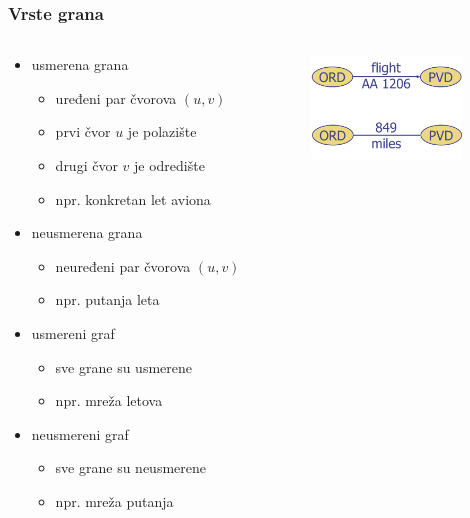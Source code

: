 \documentclass[compress,aspectratio=169]{beamer}
\begin{document}
\begin{frame}[fragile]
  \frametitle{Vrste grana}
  \begin{columns}
    \begin{column}[t]{8cm}
      \begin{itemize}
        \item usmerena grana
        \begin{itemize}
          \item uređeni par čvorova $(u,v)$
          \item prvi čvor $u$ je polazište
          \item drugi čvor $v$ je odredište
          \item npr. konkretan let aviona
        \end{itemize}
        \item neusmerena grana
        \begin{itemize}
          \item neuređeni par čvorova $(u,v)$
          \item npr. putanja leta
        \end{itemize}
        \item usmereni graf
        \begin{itemize}
          \item sve grane su usmerene
          \item npr. mreža letova
        \end{itemize}
        \item neusmereni graf
        \begin{itemize}
          \item sve grane su neusmerene
          \item npr. mreža putanja
        \end{itemize}
      \end{itemize}
    \end{column}
    \begin{column}[t]{4cm}
      \begin{center}
        \includegraphics[width=4cm]{asp-14-pic02.png}
      \end{center}
    \end{column}
  \end{columns}
\end{frame}
\end{document}
